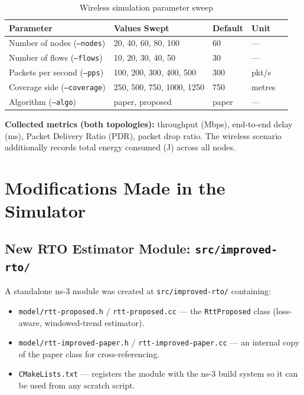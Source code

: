 \documentclass[12pt,a4paper]{report}
\begin{document}
\begin{table}[H]
  \centering
  \caption{Wireless simulation parameter sweep}
  \label{tab:wireless-sweep}
  \begin{tabular}{lllll}
    \toprule
    \textbf{Parameter} & \textbf{Values Swept} & \textbf{Default} & \textbf{Unit} \\
    \midrule
    Number of nodes (\texttt{--nodes})   & 20, 40, 60, 80, 100 & 60 & --- \\
    Number of flows (\texttt{--flows})   & 10, 20, 30, 40, 50  & 30 & --- \\
    Packets per second (\texttt{--pps}) & 100, 200, 300, 400, 500 & 300 & pkt/s \\
    Coverage side (\texttt{--coverage}) & 250, 500, 750, 1000, 1250 & 750 & metres \\
    Algorithm (\texttt{--algo}) & paper, proposed & paper & --- \\
    \bottomrule
  \end{tabular}
\end{table}

\noindent \textbf{Collected metrics (both topologies):}
throughput (Mbps), end-to-end delay (ms), Packet Delivery Ratio (PDR),
packet drop ratio.  The wireless scenario additionally records total energy
consumed (J) across all nodes.

\chapter{Modifications Made in the Simulator}
\label{ch:mods}

\section{New RTO Estimator Module: \texttt{src/improved-rto/}}

A standalone ns-3 module was created at \texttt{src/improved-rto/} containing:

\begin{itemize}
  \item \texttt{model/rtt-proposed.h} / \texttt{rtt-proposed.cc} ---
        the \texttt{RttProposed} class (loss-aware, windowed-trend estimator).
  \item \texttt{model/rtt-improved-paper.h} / \texttt{rtt-improved-paper.cc} ---
        an internal copy of the paper class for cross-referencing.
  \item \texttt{CMakeLists.txt} --- registers the module with the ns-3 build
        system so it can be used from any scratch script.
\end{itemize}
\end{document}
